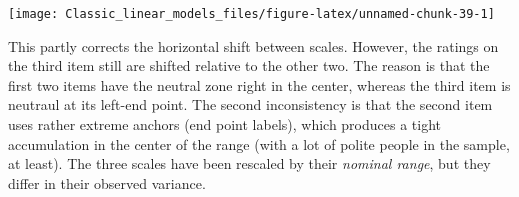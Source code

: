 \documentclass[]{svmono}
\newenvironment{Shaded}{\begin{snugshade}}{\end{snugshade}}
\newcommand{\KeywordTok}[1]{\textcolor[rgb]{0.13,0.29,0.53}{\textbf{#1}}}
\newcommand{\DataTypeTok}[1]{\textcolor[rgb]{0.13,0.29,0.53}{#1}}
\newcommand{\DecValTok}[1]{\textcolor[rgb]{0.00,0.00,0.81}{#1}}
\newcommand{\StringTok}[1]{\textcolor[rgb]{0.31,0.60,0.02}{#1}}
\newcommand{\OperatorTok}[1]{\textcolor[rgb]{0.81,0.36,0.00}{\textbf{#1}}}
\newcommand{\NormalTok}[1]{#1}
\begin{document}
\begin{Shaded}
\end{Shaded}

\texttt{[image: Classic\_linear\_models\_files/figure-latex/unnamed-chunk-39-1]}

This partly corrects the horizontal shift between scales. However, the
ratings on the third item still are shifted relative to the other two.
The reason is that the first two items have the neutral zone right in
the center, whereas the third item is neutraul at its left-end point.
The second inconsistency is that the second item uses rather extreme
anchors (end point labels), which produces a tight accumulation in the
center of the range (with a lot of polite people in the sample, at
least). The three scales have been rescaled by their \emph{nominal
range}, but they differ in their observed variance.
\end{document}
